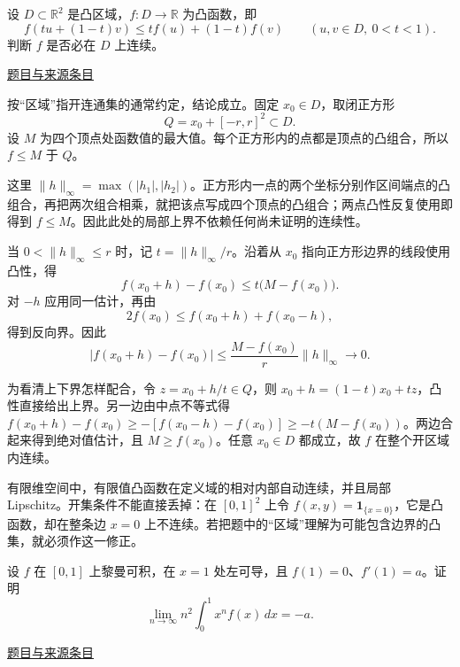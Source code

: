 \documentclass[UTF8,12pt,a4paper,fontset=fandol]{ctexart}
\begin{document}
\begin{example}[来源序号3]\label{ex:pre02-math:3}\label{pr:pre02-math:3}

设 $D\subset\mathbb R^2$ 是凸区域，$f:D\to\mathbb R$ 为凸函数，即
\[
f(tu+(1-t)v)\le tf(u)+(1-t)f(v)
\qquad(u,v\in D,\ 0<t<1).
\]
判断 $f$ 是否必在 $D$ 上连续。

\par\href{https://github.com/lzxcr/cmc-mathematics/blob/64916fa1fdbc3e444a652eca204d5669058ee321/src/problems/preliminary/02/03.md}{题目与来源条目}

\end{example}

\begin{solve}\label{ans:pre02-math:3}

按“区域”指开连通集的通常约定，结论成立。固定 $x_0\in D$，取闭正方形
\[
Q=x_0+[-r,r]^2\subset D.
\]
设 $M$ 为四个顶点处函数值的最大值。每个正方形内的点都是顶点的凸组合，所以 $f\le M$ 于 $Q$。

这里 $\|h\|_\infty=\max(|h_1|,|h_2|)$。正方形内一点的两个坐标分别作区间端点的凸组合，再把两次组合相乘，就把该点写成四个顶点的凸组合；两点凸性反复使用即得到 $f\le M$。因此此处的局部上界不依赖任何尚未证明的连续性。

当 $0<\|h\|_\infty\le r$ 时，记 $t=\|h\|_\infty/r$。沿着从 $x_0$ 指向正方形边界的线段使用凸性，得
\[
f(x_0+h)-f(x_0)\le t\bigl(M-f(x_0)\bigr).
\]
对 $-h$ 应用同一估计，再由
\[
2f(x_0)\le f(x_0+h)+f(x_0-h),
\]
得到反向界。因此
\[
|f(x_0+h)-f(x_0)|
\le\frac{M-f(x_0)}r\|h\|_\infty\longrightarrow0.
\]

为看清上下界怎样配合，令 $z=x_0+h/t\in Q$，则 $x_0+h=(1-t)x_0+tz$，凸性直接给出上界。另一边由中点不等式得 $f(x_0+h)-f(x_0)\ge-[f(x_0-h)-f(x_0)]\ge-t(M-f(x_0))$。两边合起来得到绝对值估计，且 $M\ge f(x_0)$。任意 $x_0\in D$ 都成立，故 $f$ 在整个开区域内连续。

\end{solve}

\begin{remark}[方法与条件]有限维空间中，有限值凸函数在定义域的相对内部自动连续，并且局部 Lipschitz。开集条件不能直接丢掉：在 $[0,1]^2$ 上令 $f(x,y)=\mathbf1_{\{x=0\}}$，它是凸函数，却在整条边 $x=0$ 上不连续。若把题中的“区域”理解为可能包含边界的凸集，就必须作这一修正。\end{remark}

\begin{example}[来源序号4]\label{ex:pre02-math:4}\label{pr:pre02-math:4}

设 $f$ 在 $[0,1]$ 上黎曼可积，在 $x=1$ 处左可导，且 $f(1)=0$、$f'(1)=a$。证明
\[
\lim_{n\to\infty}n^2\int_0^1x^nf(x)\,dx=-a.
\]

\par\href{https://github.com/lzxcr/cmc-mathematics/blob/64916fa1fdbc3e444a652eca204d5669058ee321/src/problems/preliminary/02/04.md}{题目与来源条目}

\end{example}
\end{document}
